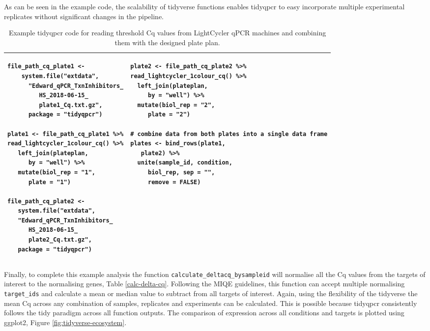 \documentclass[../main.tex]{subfiles}
\begin{document}
As can be seen in the example code, the scalability of tidyverse functions enables tidyqpcr to easy incorporate multiple experimental replicates without significant changes in the pipeline.
\begin{table}
\centering
\begin{tabular}{|p{5.6cm}  p{5.6cm}|}
\hline
 \begin{lstlisting}[firstnumber=40, style=mystyle]
 file_path_cq_plate1 <- 
    system.file("extdata",
      "Edward_qPCR_TxnInhibitors_
         HS_2018-06-15_
         plate1_Cq.txt.gz",
      package = "tidyqpcr")

plate1 <- file_path_cq_plate1 %>%
read_lightcycler_1colour_cq() %>%
   left_join(plateplan,
      by = "well") %>%
   mutate(biol_rep = "1",
      plate = "1")

file_path_cq_plate2 <-
   system.file("extdata",
   "Edward_qPCR_TxnInhibitors_
      HS_2018-06-15_
      plate2_Cq.txt.gz",
   package = "tidyqpcr")
\end{lstlisting} &
\begin{lstlisting}[firstnumber=60, style=mystyle]
plate2 <- file_path_cq_plate2 %>%
read_lightcycler_1colour_cq() %>%
  left_join(plateplan,
     by = "well") %>%
  mutate(biol_rep = "2",
     plate = "2")

# combine data from both plates into a single data frame
plates <- bind_rows(plate1,
   plate2) %>%
  unite(sample_id, condition,
     biol_rep, sep = "",
     remove = FALSE)
\end{lstlisting} \\
\hline
\end{tabular}
\caption*{Example tidyqpcr code for reading threshold Cq values from LightCycler qPCR machines and combining them with the designed plate plan.}
\label{read-raw-data}
\end{table}

Finally, to complete this example analysis the function \lstinline{calculate_deltacq_bysampleid} will normalise all the Cq values from the targets of interest to the normalising genes, Table \ref{calc-delta-cq}. 
Following the MIQE guidelines,  this function can accept multiple normalising \lstinline{target_ids} and calculate a mean or median value to subtract from all targets of interest. 
Again, using the flexibility of the tidyverse the mean Cq across any combination of samples, replicates and experiments can be calculated. 
This is possible because tidyqpcr consistently follows the tidy paradigm across all function outputs. 
The comparison of expression across all conditions and targets is plotted using ggplot2, Figure \ref{fig:tidyverse-ecosystem}.
\end{document}
